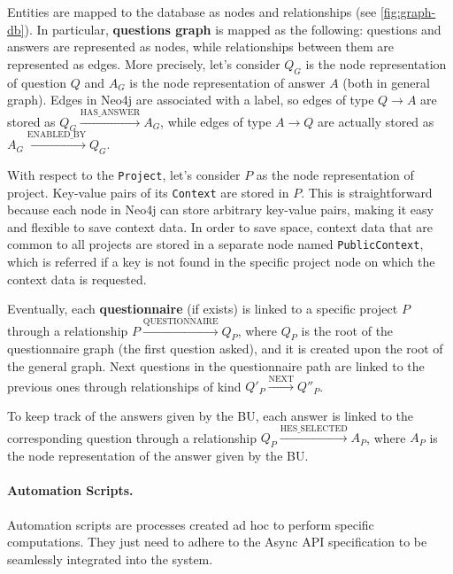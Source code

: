 \documentclass[12pt,a4paper,openright,twoside]{book}
\begin{document}
Entities are mapped to the database as nodes and relationships (see \cref{fig:graph-db}).
%
In particular, \textbf{questions graph} is mapped as the following: questions and answers are represented as nodes, while relationships between them are represented as edges.
%
More precisely, let's consider $Q_G$ is the node representation of question $Q$ and $A_G$ is the node representation of answer $A$ (both in general graph).
%
Edges in Neo4j are associated with a label, so edges of type $Q \to A$ are stored as $Q_G \xrightarrow{\text{HAS\_ANSWER}} A_G$, while edges of type $A \to Q$ are actually stored as $A_G \xrightarrow{\text{ENABLED\_BY}} Q_G$.


With respect to the \texttt{Project}, let's consider $P$ as the node representation of project.
%
Key-value pairs of its \texttt{Context} are stored in $P$.
%
This is straightforward because each node in Neo4j can store arbitrary key-value pairs, making it easy and flexible to save context data.
%
In order to save space, context data that are common to all projects are stored in a separate node named \texttt{PublicContext}, which is referred if a key is not found in the specific project node on which the context data is requested.

Eventually, each \textbf{questionnaire} (if exists) is linked to a specific project $P$ through a relationship $P \xrightarrow{\text{QUESTIONNAIRE}} Q_P$, where $Q_P$ is the root of the questionnaire graph (the first question asked), and it is created upon the root of the general graph.
%
Next questions in the questionnaire path are linked to the previous ones through relationships of kind $Q'_P \xrightarrow{\text{NEXT}} Q''_P$.

To keep track of the answers given by the \ac{BU}, each answer is linked to the corresponding question through a relationship $Q_P \xrightarrow{\text{HES\_SELECTED}} A_P$, where $A_P$ is the node representation of the answer given by the \ac{BU}.

\paragraph{Automation Scripts.}

Automation scripts are processes created ad hoc to perform specific computations.
%
They just need to adhere to the Async API specification to be seamlessly integrated into the system.
%
\end{document}

